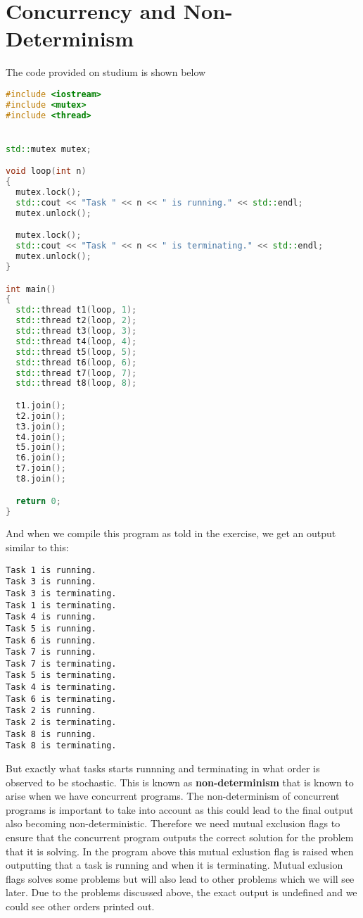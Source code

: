 \section{Concurrency and Non-Determinism}

The code provided on studium is shown below

\begin{lstlisting}[language=C++, caption=non-determinism.cpp]
#include <iostream>
#include <mutex>
#include <thread>


std::mutex mutex;

void loop(int n)
{
  mutex.lock();
  std::cout << "Task " << n << " is running." << std::endl;
  mutex.unlock();

  mutex.lock();
  std::cout << "Task " << n << " is terminating." << std::endl;
  mutex.unlock();
}

int main()
{
  std::thread t1(loop, 1);
  std::thread t2(loop, 2);
  std::thread t3(loop, 3);
  std::thread t4(loop, 4);
  std::thread t5(loop, 5);
  std::thread t6(loop, 6);
  std::thread t7(loop, 7);
  std::thread t8(loop, 8);

  t1.join();
  t2.join();
  t3.join();
  t4.join();
  t5.join();
  t6.join();
  t7.join();
  t8.join();

  return 0;
}
\end{lstlisting}

And when we compile this program as told in the exercise, we get an output
similar to this:

\begin{lstlisting}
Task 1 is running.
Task 3 is running.
Task 3 is terminating.
Task 1 is terminating.
Task 4 is running.
Task 5 is running.
Task 6 is running.
Task 7 is running.
Task 7 is terminating.
Task 5 is terminating.
Task 4 is terminating.
Task 6 is terminating.
Task 2 is running.
Task 2 is terminating.
Task 8 is running.
Task 8 is terminating.
\end{lstlisting}

But exactly what tasks starts runnning and terminating in what order is
observed to be stochastic. This is known as \textbf{non-determinism} that is 
known to arise when we have concurrent programs. The non-determinism
of concurrent programs is important to take into account as this could lead to
the final output also becoming non-deterministic. Therefore we need mutual 
exclusion flags to ensure that the concurrent program outputs the correct solution
for the problem that it is solving. In the program above this mutual exlustion
flag is raised when outputting that a task is running and when it is terminating.
Mutual exlusion flags solves some problems but will also lead to other problems
which we will see later. Due to the problems discussed above, the exact output
is undefined and we could see other orders printed out.
